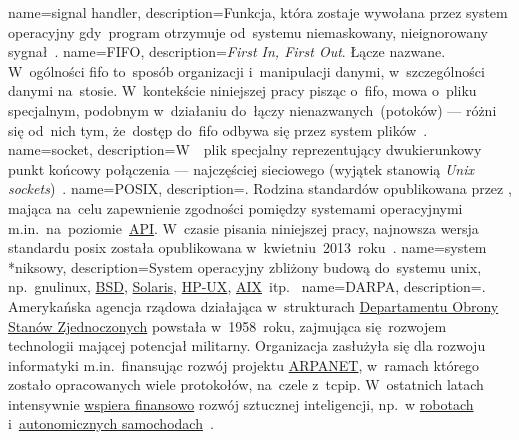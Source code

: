 {
	name={signal handler},
	description={Funkcja, która zostaje wywołana przez system operacyjny gdy~program otrzymuje od~systemu niemaskowany, nieignorowany sygnał~\cite{signal-handler}.}
}
{
	name={FIFO},
	description={\emph{First In, First Out}. Łącze nazwane. W~ogólności \gls{fifo} to~sposób organizacji i~manipulacji danymi, w~szczególności danymi na~stosie. W~kontekście niniejszej pracy pisząc o~\gls{fifo}, mowa o~pliku specjalnym, podobnym w~działaniu do~łączy nienazwanych~(potoków) --- różni się od~nich tym, że~dostęp do~\gls{fifo} odbywa się przez system plików~\cite{fifo-manual}.}
}
{
	name={socket},
	description={W~~plik specjalny reprezentujący dwukierunkowy punkt końcowy połączenia --- najczęściej sieciowego (wyjątek stanowią \emph{Unix sockets})~\cite{socket-definition-oracle}.}
}
{
	name={POSIX},
	description={. Rodzina standardów opublikowana przez , mająca na~celu zapewnienie zgodności pomiędzy systemami operacyjnymi m.in.~na~poziomie~\href{https://en.wikipedia.org/wiki/Application_programming_interface}{API}. W~czasie pisania niniejszej pracy, najnowsza wersja standardu \gls{posix} została opublikowana w~kwietniu~2013~roku~\cite{posix-ieee,posix-opengroup}.}
}
{
	name={system \mbox{*niksowy}},
	description={System operacyjny zbliżony budową do~systemu \gls{unix}, np.~\gls{gnulinux}, \href{https://en.wikipedia.org/wiki/Berkeley_Software_Distribution}{BSD}, \href{https://en.wikipedia.org/wiki/Solaris_(operating_system)}{Solaris}, \href{https://en.wikipedia.org/wiki/HP-UX}{HP-UX}, \href{https://en.wikipedia.org/wiki/Secure_Shell}{AIX}~itp.~\cite{wiki:unix-like}}
}
{
	name={DARPA},
	description={. Amerykańska agencja rządowa działająca w~strukturach \href{https://en.wikipedia.org/wiki/United_States_Department_of_Defense}{Departamentu Obrony Stanów Zjednoczonych} powstała w~1958~roku, zajmująca się~rozwojem technologii mającej potencjał militarny. Organizacja zasłużyła się dla rozwoju informatyki m.in.~finansując rozwój projektu \href{https://en.wikipedia.org/wiki/ARPANET}{ARPANET}, w~ramach którego zostało opracowanych wiele protokołów, na~czele z~\gls{tcpip}. W~ostatnich latach intensywnie \href{https://en.wikipedia.org/wiki/SyNAPSE}{wspiera finansowo} rozwój sztucznej inteligencji, np.~w \href{https://en.wikipedia.org/wiki/DARPA_Robotics_Challenge}{robotach} i~\href{https://en.wikipedia.org/wiki/DARPA_Grand_Challenge}{autonomicznych samochodach}~\cite{darpa-grandchallange,darpa-robotics-challange,darpa-robotics-challange-ieee}.}
}

